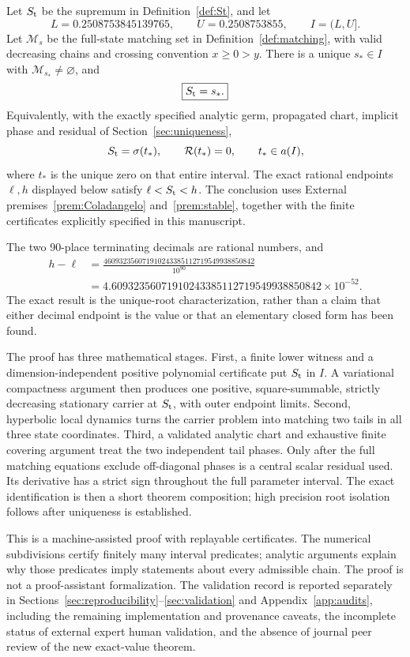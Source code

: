 \begin{theorem}\label{thm:main}
Let \(S_{\mathrm t}\) be the supremum in Definition~\ref{def:St}, and let
\[
 L=0.2508753845139765,\qquad U=0.2508753855,\qquad I=(L,U].
\]
Let \(\mathcal M_s\) be the full-state matching set in
Definition~\ref{def:matching}, with valid decreasing chains and crossing
convention \(x\geq0>y\). There is a unique \(s_*\in I\) with
\(\mathcal M_{s_*}\ne\varnothing\), and
\[
 \boxed{S_{\mathrm t}=s_*.}
\]
Equivalently, with the exactly specified analytic germ, propagated chart,
implicit phase and residual of Section~\ref{sec:uniqueness},
\[
 S_{\mathrm t}=\sigma(t_*),\qquad
 \mathcal R(t_*)=0,\qquad t_*\in a(I),
\]
where \(t_*\) is the unique zero on that entire interval. The exact rational
endpoints \(\ell,h\) displayed below satisfy \(\ell<S_{\mathrm t}<h\).
The conclusion uses External premises~\ref{prem:Coladangelo}
and~\ref{prem:stable}, together with the finite certificates explicitly
specified in this manuscript.
\end{theorem}

The two 90-place terminating decimals are rational numbers, and
\begin{equation}\label{eq:width}
\begin{aligned}
 h-\ell&=
 \frac{460932356071910243385112719549938850842}{10^{90}}
 \\
 &=4.60932356071910243385112719549938850842\times10^{-52}.
\end{aligned}
\end{equation}
The exact result is the unique-root characterization, rather than a claim
that either decimal endpoint is the value or that an elementary closed form
has been found.

The proof has three mathematical stages. First, a finite lower witness and
a dimension-independent positive polynomial certificate put \(S_{\mathrm t}\) in
\(I\). A variational compactness argument then produces one positive,
square-summable, strictly decreasing stationary carrier at \(S_{\mathrm t}\), with
outer endpoint limits. Second, hyperbolic local dynamics turns the carrier
problem into matching two tails in all three state coordinates. Third, a
validated analytic chart and exhaustive finite covering argument treat the
two independent tail phases. Only after the full matching equations exclude
off-diagonal phases is a central scalar residual used. Its derivative has a
strict sign throughout the full parameter interval. The exact identification
is then a short theorem composition; high precision root isolation follows
after uniqueness is established.

This is a machine-assisted proof with replayable certificates. The numerical
subdivisions certify finitely many interval predicates; analytic arguments
explain why those predicates imply statements about every admissible chain.
The proof is not a proof-assistant formalization. The validation record is
reported separately in Sections~\ref{sec:reproducibility}--\ref{sec:validation}
and Appendix~\ref{app:audits}, including the remaining implementation and
provenance caveats, the incomplete status of external expert human validation,
and the absence of journal peer review of the new exact-value theorem.
